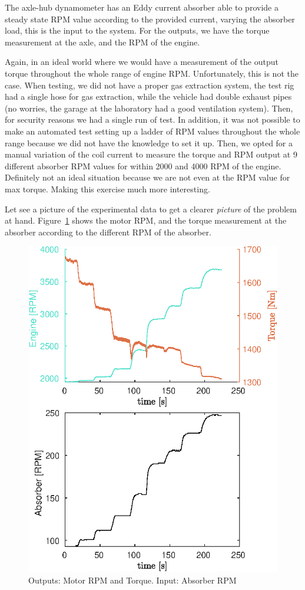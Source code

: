 \documentclass{article}
\begin{document}
The axle-hub dynamometer has an Eddy current absorber able to provide a steady state RPM value according to the provided current, varying the absorber load, this is the input to the system. For the outputs, we have the torque measurement at the axle, and the RPM of the engine.

Again, in an ideal world where we would have a measurement of the output torque throughout the whole range of engine RPM. Unfortunately, this is not the case. When testing, we did not have a proper gas extraction system, the test rig had a single hose for gas extraction, while the vehicle had double exhaust pipes (no worries, the garage at the laboratory had a good ventilation system). Then, for security reasons we had a single run of test. In addition, it was not possible to make an automated test setting up a ladder of RPM values throughout the whole range because we did not have the knowledge to set it up. Then, we opted for a manual variation of the coil current to measure the torque and RPM output at 9 different absorber RPM values for within 2000 and 4000 RPM of the engine. Definitely not an ideal situation because we are not even at the RPM value for max torque. Making this exercise much more interesting.

Let see a picture of the experimental data to get a clearer \textit{picture} of the problem at hand. Figure~\ref{fig:data} shows the motor RPM, and the torque measurement at the absorber according to the different RPM of the absorber.
\begin{figure}[ht]
	\centering
	\includegraphics[width=0.7\linewidth]{./figures/data_fig.eps}
	\caption{Outputs: Motor RPM and Torque. Input: Absorber RPM}
	\label{fig:data}
\end{figure}
\end{document}

